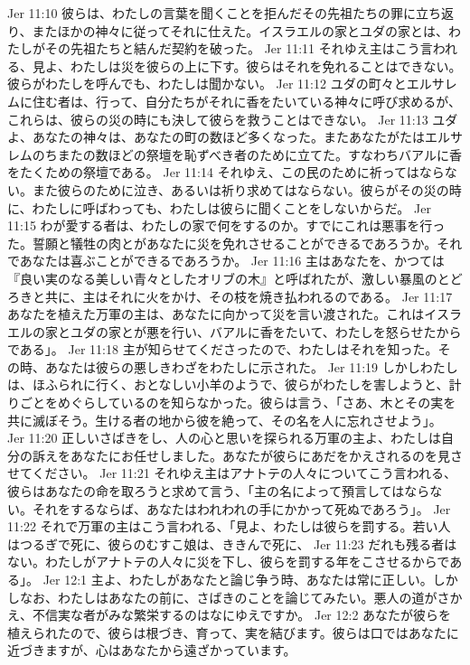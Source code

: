 Jer 11:10  彼らは、わたしの言葉を聞くことを拒んだその先祖たちの罪に立ち返り、またほかの神々に従ってそれに仕えた。イスラエルの家とユダの家とは、わたしがその先祖たちと結んだ契約を破った。
Jer 11:11  それゆえ主はこう言われる、見よ、わたしは災を彼らの上に下す。彼らはそれを免れることはできない。彼らがわたしを呼んでも、わたしは聞かない。
Jer 11:12  ユダの町々とエルサレムに住む者は、行って、自分たちがそれに香をたいている神々に呼び求めるが、これらは、彼らの災の時にも決して彼らを救うことはできない。
Jer 11:13  ユダよ、あなたの神々は、あなたの町の数ほど多くなった。またあなたがたはエルサレムのちまたの数ほどの祭壇を恥ずべき者のために立てた。すなわちバアルに香をたくための祭壇である。
Jer 11:14  それゆえ、この民のために祈ってはならない。また彼らのために泣き、あるいは祈り求めてはならない。彼らがその災の時に、わたしに呼ばわっても、わたしは彼らに聞くことをしないからだ。
Jer 11:15  わが愛する者は、わたしの家で何をするのか。すでにこれは悪事を行った。誓願と犠牲の肉とがあなたに災を免れさせることができるであろうか。それであなたは喜ぶことができるであろうか。
Jer 11:16  主はあなたを、かつては『良い実のなる美しい青々としたオリブの木』と呼ばれたが、激しい暴風のとどろきと共に、主はそれに火をかけ、その枝を焼き払われるのである。
Jer 11:17  あなたを植えた万軍の主は、あなたに向かって災を言い渡された。これはイスラエルの家とユダの家とが悪を行い、バアルに香をたいて、わたしを怒らせたからである」。
Jer 11:18  主が知らせてくださったので、わたしはそれを知った。その時、あなたは彼らの悪しきわざをわたしに示された。
Jer 11:19  しかしわたしは、ほふられに行く、おとなしい小羊のようで、彼らがわたしを害しようと、計りごとをめぐらしているのを知らなかった。彼らは言う、「さあ、木とその実を共に滅ぼそう。生ける者の地から彼を絶って、その名を人に忘れさせよう」。
Jer 11:20  正しいさばきをし、人の心と思いを探られる万軍の主よ、わたしは自分の訴えをあなたにお任せしました。あなたが彼らにあだをかえされるのを見させてください。
Jer 11:21  それゆえ主はアナトテの人々についてこう言われる、彼らはあなたの命を取ろうと求めて言う、「主の名によって預言してはならない。それをするならば、あなたはわれわれの手にかかって死ぬであろう」。
Jer 11:22  それで万軍の主はこう言われる、「見よ、わたしは彼らを罰する。若い人はつるぎで死に、彼らのむすこ娘は、ききんで死に、
Jer 11:23  だれも残る者はない。わたしがアナトテの人々に災を下し、彼らを罰する年をこさせるからである」。
Jer 12:1  主よ、わたしがあなたと論じ争う時、あなたは常に正しい。しかしなお、わたしはあなたの前に、さばきのことを論じてみたい。悪人の道がさかえ、不信実な者がみな繁栄するのはなにゆえですか。
Jer 12:2  あなたが彼らを植えられたので、彼らは根づき、育って、実を結びます。彼らは口ではあなたに近づきますが、心はあなたから遠ざかっています。
